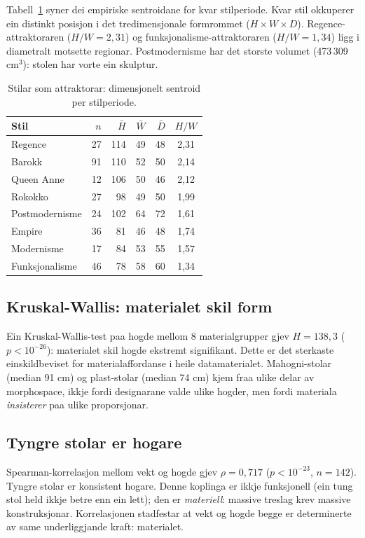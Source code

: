 \documentclass[10pt, a4paper, twocolumn]{article}
\begin{document}
Tabell~\ref{tab:attraktorar} syner dei empiriske sentroidane for kvar stilperiode. Kvar stil okkuperer ein distinkt posisjon i det tredimensjonale formrommet ($H \times W \times D$). Regence-attraktoraren ($H/W = 2{,}31$) og funksjonalisme-attraktoraren ($H/W = 1{,}34$) ligg i diametralt motsette regionar. Postmodernisme har det storste volumet (473\,309 cm$^3$): stolen har vorte ein skulptur.

\begin{table}[!ht]
\centering
\caption{Stilar som attraktorar: dimensjonelt sentroid per stilperiode.}
\label{tab:attraktorar}
\begin{tabular}{lrrrrc}
\toprule
\textbf{Stil} & $n$ & $\bar{H}$ & $\bar{W}$ & $\bar{D}$ & $H/W$ \\
\midrule
Regence & 27 & 114 & 49 & 48 & 2,31 \\
Barokk & 91 & 110 & 52 & 50 & 2,14 \\
Queen Anne & 12 & 106 & 50 & 46 & 2,12 \\
Rokokko & 27 & 98 & 49 & 50 & 1,99 \\
Postmodernisme & 24 & 102 & 64 & 72 & 1,61 \\
Empire & 36 & 81 & 46 & 48 & 1,74 \\
Modernisme & 17 & 84 & 53 & 55 & 1,57 \\
Funksjonalisme & 46 & 78 & 58 & 60 & 1,34 \\
\bottomrule
\end{tabular}
\end{table}

\subsection{Kruskal-Wallis: materialet skil form}

Ein Kruskal-Wallis-test paa hogde mellom 8 materialgrupper gjev $H = 138{,}3$ ($p < 10^{-26}$): materialet skil hogde ekstremt signifikant. Dette er det sterkaste einskildbeviset for materialaffordanse i heile datamaterialet. Mahogni-stolar (median 91 cm) og plast-stolar (median 74 cm) kjem fraa ulike delar av morphospace, ikkje fordi designarane valde ulike hogder, men fordi materiala \emph{insisterer} paa ulike proporsjonar.

\subsection{Tyngre stolar er hogare}

Spearman-korrelasjon mellom vekt og hogde gjev $\rho = 0{,}717$ ($p < 10^{-23}$, $n = 142$). Tyngre stolar er konsistent hogare. Denne koplinga er ikkje funksjonell (ein tung stol held ikkje betre enn ein lett); den er \emph{materiell}: massive treslag krev massive konstruksjonar. Korrelasjonen stadfestar at vekt og hogde begge er determinerte av same underliggjande kraft: materialet.
\end{document}
